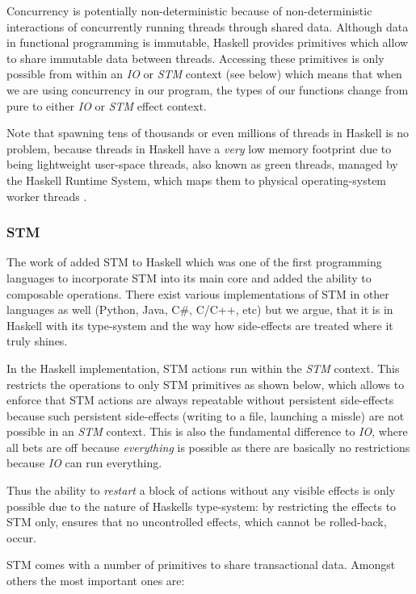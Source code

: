Concurrency is potentially non-deterministic because of non-deterministic interactions of concurrently running threads through shared data. Although data in functional programming is immutable, Haskell provides primitives which allow to share immutable data between threads. Accessing these primitives is only possible from within an \textit{IO} or \textit{STM} context (see below) which means that when we are using concurrency in our program, the types of our functions change from pure to either \textit{IO} or \textit{STM} effect context.

Note that spawning tens of thousands or even millions of threads in Haskell is no problem, because threads in Haskell have a \textit{very} low memory footprint due to being lightweight user-space threads, also known as green threads, managed by the Haskell Runtime System, which maps them to physical operating-system worker threads \cite{marlow_runtime_2009}.

\subsubsection{STM}
The work of \cite{harris_composable_2005, harris_transactional_2006} added STM to Haskell which was one of the first programming languages to incorporate STM into its main core and added the ability to composable operations. There exist various implementations of STM in other languages as well (Python, Java, C\#, C/C++, etc) but we argue, that it is in Haskell with its type-system and the way how side-effects are treated where it truly shines.

In the Haskell implementation, STM actions run within the \textit{STM} context. This restricts the operations to only STM primitives as shown below, which allows to enforce that STM actions are always repeatable without persistent side-effects because such persistent side-effects (writing to a file, launching a missle) are not possible in an \textit{STM} context. This is also the fundamental difference to  \textit{IO}, where all bets are off because \textit{everything} is possible as there are basically no restrictions because \textit{IO} can run everything.

Thus the ability to \textit{restart} a block of actions without any visible effects is only possible due to the nature of Haskells type-system: by restricting the effects to STM only, ensures that no uncontrolled effects, which cannot be rolled-back, occur.

STM comes with a number of primitives to share transactional data. Amongst others the most important ones are:


